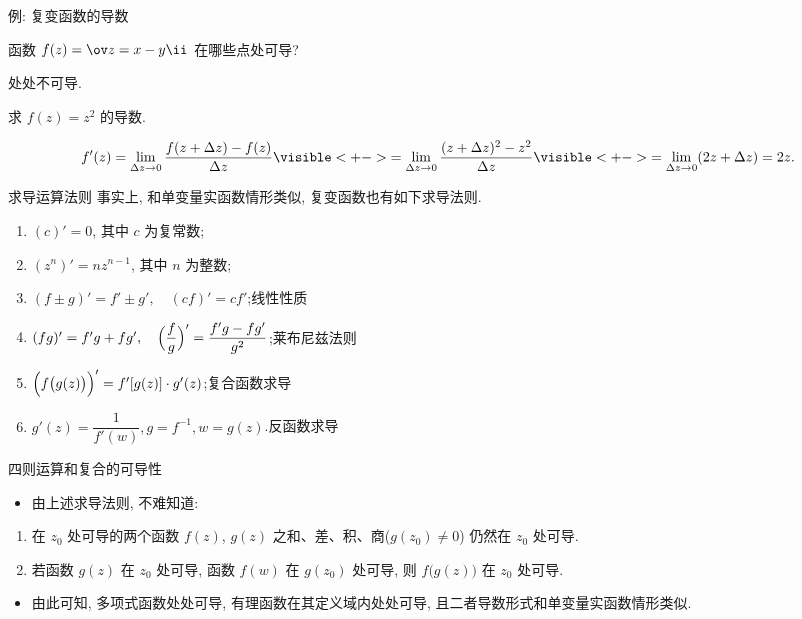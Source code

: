 \begin{frame}{例: 复变函数的导数}
	\onslide<+->
	\begin{exercise}[near]
		函数 $f(z)=\ov z=x-y\ii$ 在哪些点处可导? 
	\end{exercise}
	\onslide<+->
	\begin{answer}[nearprev]
		处处不可导.
	\end{answer}
	\onslide<+->
	\begin{example}[nearnext]
		求 $f(z)=z^2$ 的导数.
	\end{example}
	\onslide<+->
	\begin{solution}[near]
		\bigdel
		\[
			f'(z)=\lim_{\Delta z\to 0}\frac{f(z+\Delta z)-f(z)}{\Delta z}
			\visible<+->{=\lim_{\Delta z\to 0}\frac{(z+\Delta z)^2-z^2}{\Delta z}}
			\visible<+->{=\lim_{\Delta z\to 0}(2z+\Delta z)=2z.}
		\]
		\bigdel
	\end{solution}
\end{frame}


\begin{frame}{求导运算法则}
	\onslide<+->
	事实上, 和单变量实函数情形类似, 复变函数也有如下求导法则.
	\onslide<+->
	\begin{theorem}
		\begin{enumerate}
			\item $(c)'=0$, 其中 $c$ 为复常数;
			\item $(z^n)'=nz^{n-1}$, 其中 $n$ 为整数;
			\item $(f\pm g)'=f'\pm g',\quad (cf)'=cf'$;\hfill\alert{线性性质}
			\item $(fg)'=f'g+fg',\quad \Bigl(\dfrac fg\Bigr)'=\dfrac{f'g-fg'}{g^2}$;\hfill\alert{莱布尼兹法则}
			\item $\Bigl(f\bigl(g(z)\bigr)\Bigr)'=f'[g(z)]\cdot g'(z)$;\hfill\alert{复合函数求导}
			\item $g'(z)=\dfrac1{f'(w)}, g=f^{-1}, w=g(z)$.\hfill\alert{反函数求导}
		\end{enumerate}
	\end{theorem}
\end{frame}


\begin{frame}{四则运算和复合的可导性}
	\begin{itemize}
		\item 由上述求导法则, 不难知道:
	\end{itemize}
	\onslide<+->
	\begin{theorem}
		\begin{enumerate}
			\item 在 $z_0$ 处可导的两个函数 $f(z)$, $g(z)$ 之和、差、积、商($g(z_0)\neq 0$) 仍然在 $z_0$ 处可导.
			\item 若函数 $g(z)$ 在 $z_0$ 处可导, 函数 $f(w)$ 在 $g(z_0)$ 处可导, 则 $f\bigl(g(z)\bigr)$ 在 $z_0$ 处可导.
		\end{enumerate}
	\end{theorem}
	\begin{itemize}
		\item 由此可知, 多项式函数处处可导, 有理函数在其定义域内处处可导, 且二者导数形式和单变量实函数情形类似.
	\end{itemize}
\end{frame}


